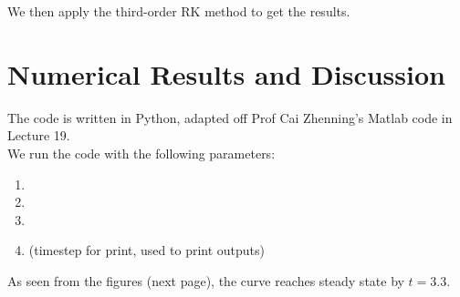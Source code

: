 \documentclass[a4paper,8pt]{article}
\begin{document}
We then apply the third-order RK method to get the results.

\section{Numerical Results and Discussion}

The code is written in Python, adapted off Prof Cai Zhenning's Matlab code in Lecture 19.\\

\noindent
We run the code with the following parameters:
\begin{enumerate}[label=\arabic*.]
\setlength{\itemsep}{0pt}
\item {}
\item {}
\item {}
\item {} (timestep for print, used to print outputs)
\end{enumerate}

As seen from the figures (next page), the curve reaches steady state by $t=3.3$.
\end{document}

